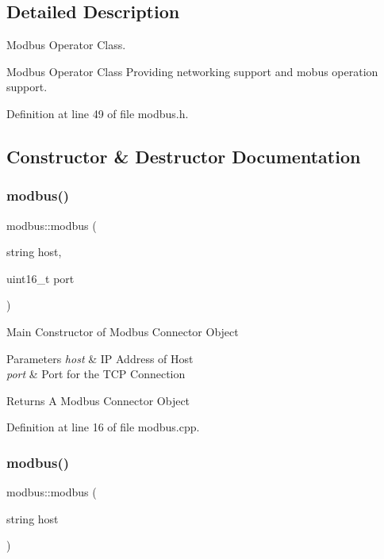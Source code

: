 \subsection{Detailed Description}
Modbus Operator Class. 

Modbus Operator Class Providing networking support and mobus operation support. 

Definition at line 49 of file modbus.\+h.



\subsection{Constructor \& Destructor Documentation}
\mbox{\label{classmodbus_a8a92b53fdbacc156cd2b5f21a244b5f2}} 
\subsubsection{\texorpdfstring{modbus()}{modbus()}\hspace{0.1cm}{\footnotesize\ttfamily [1/2]}}
{\footnotesize\ttfamily modbus\+::modbus (\begin{DoxyParamCaption}\item[{string}]{host,  }\item[{uint16\+\_\+t}]{port }\end{DoxyParamCaption})}

Main Constructor of Modbus Connector Object 
\begin{DoxyParams}{Parameters}
{\em host} & IP Address of Host \\
\hline
{\em port} & Port for the T\+CP Connection \\
\hline
\end{DoxyParams}
\begin{DoxyReturn}{Returns}
A Modbus Connector Object 
\end{DoxyReturn}


Definition at line 16 of file modbus.\+cpp.

\mbox{\label{classmodbus_a6902af6b4f02a3cc07ef040c389360d2}} 
\subsubsection{\texorpdfstring{modbus()}{modbus()}\hspace{0.1cm}{\footnotesize\ttfamily [2/2]}}
{\footnotesize\ttfamily modbus\+::modbus (\begin{DoxyParamCaption}\item[{string}]{host }\end{DoxyParamCaption})}

